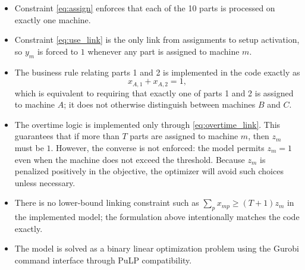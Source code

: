 \begin{itemize}
    \item Constraint \eqref{eq:assign} enforces that each of the 10 parts is processed on exactly one machine.
    \item Constraint \eqref{eq:use_link} is the only link from assignments to setup activation, so $y_m$ is forced to $1$ whenever any part is assigned to machine $m$.
    \item The business rule relating parts 1 and 2 is implemented in the code exactly as
    \[
    x_{A,1}+x_{A,2}=1,
    \]
    which is equivalent to requiring that exactly one of parts 1 and 2 is assigned to machine $A$; it does not otherwise distinguish between machines $B$ and $C$.
    \item The overtime logic is implemented only through \eqref{eq:overtime_link}. This guarantees that if more than $T$ parts are assigned to machine $m$, then $z_m$ must be $1$. However, the converse is not enforced: the model permits $z_m=1$ even when the machine does not exceed the threshold. Because $z_m$ is penalized positively in the objective, the optimizer will avoid such choices unless necessary.
    \item There is no lower-bound linking constraint such as $\sum_{p} x_{mp} \ge (T+1) z_m$ in the implemented model; the formulation above intentionally matches the code exactly.
    \item The model is solved as a binary linear optimization problem using the Gurobi command interface through PuLP compatibility.
\end{itemize}
